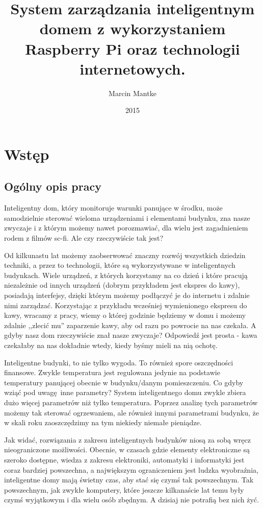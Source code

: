 \documentclass[eng,oneside]{mgr}
\author{Marcin Mantke}
\title{System zarządzania inteligentnym domem z wykorzystaniem Raspberry Pi oraz technologii internetowych.}
\date{2015}
\begin{document}
\maketitle
\tableofcontents
\chapter{Wstęp}
\section{Ogólny opis pracy}
Inteligentny dom, który monitoruje warunki panujące w środku, może samodzielnie sterować wieloma urządzeniami i elementami budynku, zna nasze zwyczaje i z którym możemy nawet porozmawiać, dla wielu jest zagadnieniem rodem z filmów sc-fi. Ale czy rzeczywiście tak jest? 

Od kilkunastu lat możemy zaobserwować znaczny rozwój wszystkich dziedzin techniki, a przez to technologii, które są wykorzystywane w inteligentnych budynkach. Wiele urządzeń, z których korzystamy na co dzień i które pracują niezależnie od innych urządzeń (dobrym przykładem jest ekspres do kawy), posiadają interfejsy, dzięki którym możemy podłączyć je do internetu i zdalnie nimi zarządzać. Korzystając z przykładu wcześniej wymienionego ekspresu do kawy, wracamy z pracy, wiemy o której godzinie będziemy w domu i możemy zdalnie ,,zlecić mu'' zaparzenie kawy, aby od razu po powrocie na nas czekała. A gdyby nasz dom rzeczywiście znał nasze zwyczaje? Odpowiedź jest prosta - kawa czekałaby na nas dokładnie wtedy, kiedy byśmy mieli na nią ochotę.

Inteligentne budynki, to nie tylko wygoda. To również spore oszczędności finansowe. Zwykle temperatura jest regulowana jedynie na podstawie temperatury panującej obecnie w budynku/danym pomieszczeniu. Co gdyby wziąć pod uwagę inne parametry? System inteligentnego domu zwykle zbiera dużo więcej parametrów niż tylko temperatura. Poprzez analizę tych parametrów możemy tak sterować ogrzewaniem, ale również innymi parametrami budynku, że w skali roku zaoszczędzimy na tym niekiedy niemałe pieniądze.

Jak widać, rozwiązania z zakresu inteligentnych budynków niosą za sobą wręcz nieograniczone możliwości. Obecnie, w czasach gdzie elementy elektroniczne są szeroko dostępne, wiedza z zakresu elektroniki, automatyki i informatyki jest coraz bardziej powszechna, a największym ograniczeniem jest ludzka wyobraźnia, inteligentne domy mają świetny czas, aby stać się czymś tak powszechnym. Tak powszechnym, jak zwykłe komputery, które jeszcze kilkanaście lat temu były czymś wyjątkowym i dla wielu osób zbędnym. A dzisiaj nie potrafią bez nich żyć.
\end{document}
